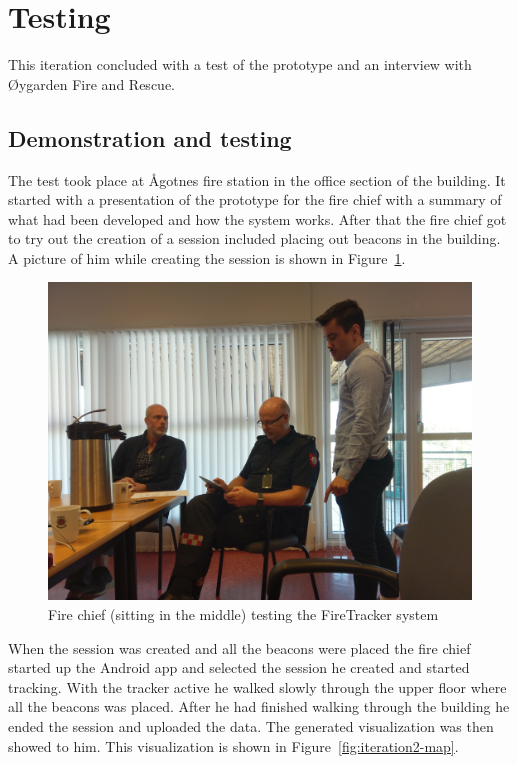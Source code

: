 \documentclass[../Main/thesis.tex]{subfiles}
\begin{document}
\section{Testing}
This iteration concluded with a test of the prototype and an interview with Øygarden Fire and Rescue.

\subsection{Demonstration and testing}
The test took place at Ågotnes fire station in the office section of the building.
It started with a presentation of the prototype for the fire chief with a summary of what had been developed and how the system works.
After that the fire chief got to try out the creation of a session included placing out beacons in the building. 
A picture of him while creating the session is shown in Figure~\ref{fig:iteration2-demo}.

\begin{figure}[h]
	\centering
	\includegraphics[width=\textwidth]{../fig/iteration2-demo}
	\caption[Fire chief testing the FireTracker system]{Fire chief (sitting in the middle) testing the FireTracker system}
	\label{fig:iteration2-demo}
\end{figure}

When the session was created and all the beacons were placed the fire chief started up the Android app and selected the session he created and started tracking.
With the tracker active he walked slowly through the upper floor where all the beacons was placed.
After he had finished walking through the building he ended the session and uploaded the data.
The generated visualization was then showed to him.
This visualization is shown in Figure~\ref{fig:iteration2-map}.
\end{document}
